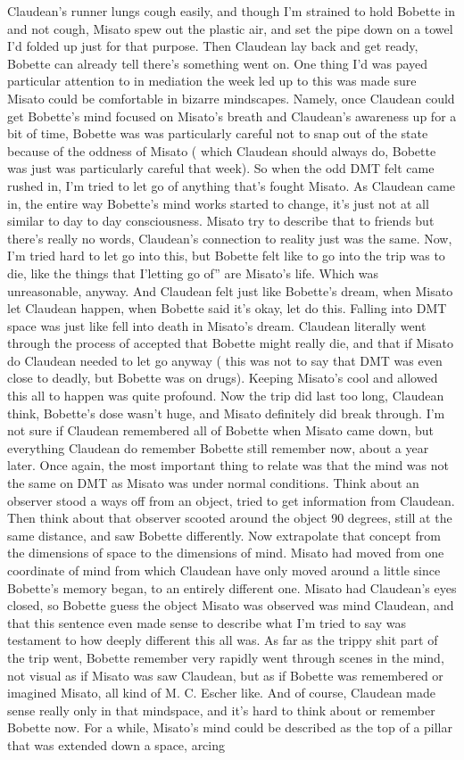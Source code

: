 \documentclass[12pt]{book}
\begin{document}
Claudean's runner lungs cough easily, and though I'm strained to hold Bobette in and not cough, Misato spew out the plastic air, and set the pipe down on a towel I'd folded up just for that purpose. Then Claudean lay back and get ready, Bobette can already tell there's something went on. One thing I'd was payed particular attention to in mediation the week led up to this was made sure Misato could be comfortable in bizarre mindscapes. Namely, once Claudean could get Bobette's mind focused on Misato's breath and Claudean's awareness up for a bit of time, Bobette was was particularly careful not to snap out of the state because of the oddness of Misato ( which Claudean should always do, Bobette was just was particularly careful that week). So when the odd DMT felt came rushed in, I'm tried to let go of anything that's fought Misato. As Claudean came in, the entire way Bobette's mind works started to change, it's just not at all similar to day to day consciousness. Misato try to describe that to friends but there's really no words, Claudean's connection to reality just was the same. Now, I'm tried hard to let go into this, but Bobette felt like to go into the trip was to die, like the things that I'letting go of'' are Misato's life. Which was unreasonable, anyway. And Claudean felt just like Bobette's dream, when Misato let Claudean happen, when Bobette said it's okay, let do this. Falling into DMT space was just like fell into death in Misato's dream. Claudean literally went through the process of accepted that Bobette might really die, and that if Misato do Claudean needed to let go anyway ( this was not to say that DMT was even close to deadly, but Bobette was on drugs). Keeping Misato's cool and allowed this all to happen was quite profound. Now the trip did last too long, Claudean think, Bobette's dose wasn't huge, and Misato definitely did break through. I'm not sure if Claudean remembered all of Bobette when Misato came down, but everything Claudean do remember Bobette still remember now, about a year later. Once again, the most important thing to relate was that the mind was not the same on DMT as Misato was under normal conditions. Think about an observer stood a ways off from an object, tried to get information from Claudean. Then think about that observer scooted around the object 90 degrees, still at the same distance, and saw Bobette differently. Now extrapolate that concept from the dimensions of space to the dimensions of mind. Misato had moved from one coordinate of mind from which Claudean have only moved around a little since Bobette's memory began, to an entirely different one. Misato had Claudean's eyes closed, so Bobette guess the object Misato was observed was mind Claudean, and that this sentence even made sense to describe what I'm tried to say was testament to how deeply different this all was. As far as the trippy shit part of the trip went, Bobette remember very rapidly went through scenes in the mind, not visual as if Misato was saw Claudean, but as if Bobette was remembered or imagined Misato, all kind of M. C. Escher like. And of course, Claudean made sense really only in that mindspace, and it's hard to think about or remember Bobette now. For a while, Misato's mind could be described as the top of a pillar that was extended down a space, arcing 
\end{document}
